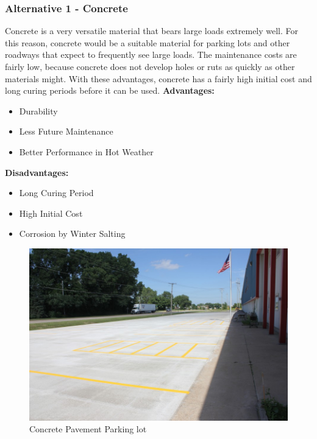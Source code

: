 \documentclass{ceri}
\begin{document}
\subsubsection{Alternative 1 - Concrete}
Concrete is a very versatile material that bears large loads extremely well. For this reason, concrete would be a suitable material for parking lots and other roadways that expect to frequently see large loads. The maintenance costs are fairly low, because concrete does not develop holes or ruts as quickly as other materials might. With these advantages, concrete has a fairly high initial cost and long curing periods before it can be used.
\textbf{Advantages:}
\begin{itemize}
    \item Durability
    \item Less Future Maintenance
    \item Better Performance in Hot Weather
\end{itemize}
\textbf{Disadvantages:}
\begin{itemize}
    \item Long Curing Period
    \item High Initial Cost
    \item Corrosion by Winter Salting
\end{itemize}

\begin{figure}[H]
    \centering
    \includegraphics[width=.7\textwidth]{images/Pavement1.png}
    \caption{Concrete Pavement Parking lot}
    \label{fig:P_CPPL}
\end{figure}
\end{document}
